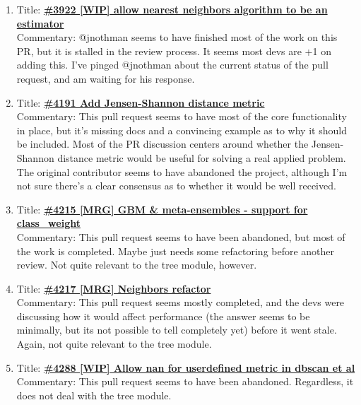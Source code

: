 \documentclass[12pt, oneside]{article}
\begin{document}
\begin{enumerate}
  \item 
  Title:
  \textbf{\href{https://github.com/scikit-learn/scikit-learn/pull/3922}
    {\#3922 [WIP] allow nearest neighbors algorithm to be an estimator}}\\
  Commentary: @jnothman seems to have finished most of the work on
  this PR, but it is stalled in the review process. It seems most devs
  are +1 on adding this. I've pinged @jnothman about the current
  status of the pull request, and am waiting for his response.

  \item 
  Title:
  \textbf{\href{https://github.com/scikit-learn/scikit-learn/pull/4191}
    {\#4191 Add Jensen-Shannon distance metric}}\\
  Commentary: This pull request seems to have most of the core
  functionality in place, but it's missing docs and a convincing
  example as to why it should be included. Most of the PR discussion
  centers around whether the Jensen-Shannon distance metric would be
  useful for solving a real applied problem. The original contributor
  seems to have abandoned the project, although I'm not sure there's a
  clear consensus as to whether it would be well received.

  \item 
  Title:
  \textbf{\href{https://github.com/scikit-learn/scikit-learn/pull/4215}
    {\#4215 [MRG] GBM \& meta-ensembles - support for class\_weight}}\\
  Commentary: This pull request seems to have been abandoned, but most
  of the work is completed. Maybe just needs some refactoring before
  another review. Not quite relevant to the tree module, however.

  \item 
  Title:
  \textbf{\href{https://github.com/scikit-learn/scikit-learn/pull/4217}
    {\#4217 [MRG] Neighbors refactor}}\\
  Commentary: This pull request seems mostly completed, and the devs
  were discussing how it would affect performance (the answer seems to
  be minimally, but its not possible to tell completely yet) before it
  went stale. Again, not quite relevant to the tree module.

  \item 
  Title:
  \textbf{\href{https://github.com/scikit-learn/scikit-learn/pull/4288}
    {\#4288 [WIP] Allow nan for userdefined metric in dbscan et al}}\\
  Commentary: This pull request seems to have been
  abandoned. Regardless, it does not deal with the tree
  module.


\end{enumerate}
\end{document}
